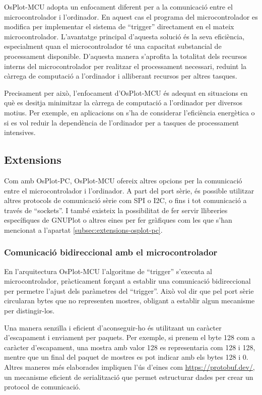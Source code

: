 \documentclass{tfgitic}[2023/06/30]
\begin{document}
OsPlot-MCU adopta un enfocament diferent per a la comunicació entre el
microcontrolador i l'ordinador. En aquest cas el programa del
microcontrolador es modifica per implementar el sistema de ``trigger''
directament en el mateix microcontrolador.
\newpage
L'avantatge principal d'aquesta solució és la seva eficiència,
especialment quan el microcontrolador té una capacitat substancial de
processament disponible. D'aquesta manera s'aprofita la totalitat dels
recursos interns del microcontrolador per realitzar el processament
necessari, reduint la càrrega de computació a l'ordinador i alliberant
recursos per altres tasques.

Precisament per això, l'enfocament d'OsPlot-MCU és adequat en
situacions en què es desitja minimitzar la càrrega de computació a
l'ordinador per diversos motius. Per exemple, en aplicacions on s'ha
de considerar l'eficiència energètica o si es vol reduir la
dependència de l'ordinador per a tasques de processament intensives.

\subsection{Extensions}

Com amb OsPlot-PC, OsPlot-MCU ofereix altres opcions per la
comunicació entre el microcontrolador i l'ordinador. A part del port
sèrie, és possible utilitzar altres protocols de comunicació sèrie com
SPI o I2C, o fins i tot comunicació a través de ``sockets''. I també
existeix la possibilitat de fer servir llibreries específiques de
GNUPlot o altres eines per fer gràfiques com les que s'han mencionat a
l'apartat \ref{subsec:extensions-osplot-pc}.

\subsubsection{Comunicació bidireccional amb el microcontrolador}

En l'arquitectura OsPlot-MCU l'algoritme de ``trigger'' s'executa al
microcontrolador, pràcticament forçant a establir una comunicació
bidireccional per permetre l'ajust dels paràmetres del ``trigger''.
Això vol dir que pel port sèrie circularan bytes que no representen
mostres, obligant a establir algun mecanisme per distingir-los.

Una manera senzilla i eficient d'aconseguir-ho és utilitzant un
caràcter d'escapament i enviament per paquets. Per exemple, si prenem
el byte 128 com a caràcter d'escapament, una mostra amb valor 128 es
representaria com 128 i 128, mentre que un final del paquet de mostres
es pot indicar amb els bytes 128 i 0. Altres maneres més elaborades
impliquen l'ús d'eines com
\href{Protobuf}{\underline{https://protobuf.dev/}}, un mecanisme
eficient de serialització que permet estructurar dades per crear un
protocol de comunicació.
\end{document}
